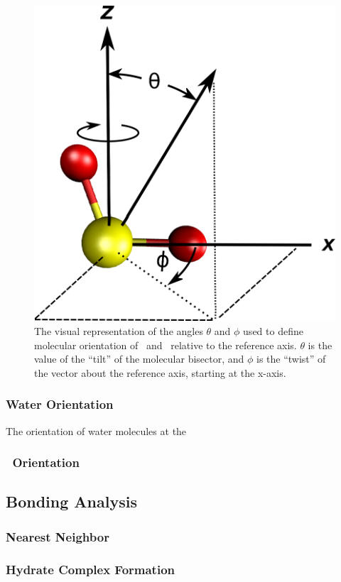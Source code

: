 \begin{figure}[h!]
	\begin{center}
		\includegraphics[scale=1.0]{images/sphericalanglegraphic.png}
		\caption{The visual representation of the angles $\theta$ and $\phi$ used to define molecular orientation of \suldiox~and \wat~relative to the reference axis. $\theta$ is the value of the ``tilt'' of the molecular bisector, and $\phi$ is the ``twist'' of the vector about the reference axis, starting at the x-axis.}
		\label{fig:spherical-angle}
	\end{center}
\end{figure}


\subsubsection{Water Orientation}
The orientation of water molecules at the 
\subsubsection{\suldiox~Orientation}

\subsection{Bonding Analysis}
\subsubsection{Nearest Neighbor}
\subsubsection{Hydrate Complex Formation}
